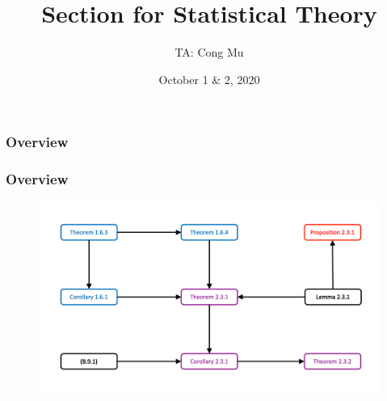 \documentclass[serif,mathserif,professionalfont]{beamer}
\title[Section for EN.553.730]{Section for Statistical Theory} %
\author{TA: Cong Mu} %
\institute[cmu2@jhu.edu] %
{
Office Hour: Wednesday 09:30AM - 11:30AM
\medskip
\textit{} %
}
\date{October 1 \& 2, 2020} %
\begin{document}
\begin{frame}
\titlepage %
\end{frame}

\begin{frame}
\frametitle{Overview} %
\tableofcontents %
\end{frame}





\begin{frame}
	
	\frametitle{Overview}
	
	\begin{figure}
		\includegraphics[width=1\linewidth]{W5F1}
	\end{figure}
	
	
\end{frame}
\end{document}
